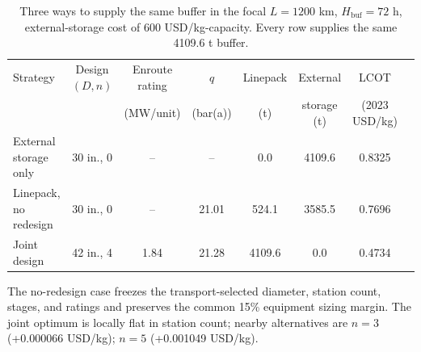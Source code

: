 \begin{table}[!t]
\centering
\caption{Three ways to supply the same buffer in the focal $L=1200$ km, $H_{\mathrm{buf}}=72$ h, external-storage cost of 600 USD/kg-capacity. Every row supplies the same 4109.6 t buffer.}
\label{tab:buffer_design_counterfactuals}
\small
\setlength{\tabcolsep}{4.5pt}
\begin{tabular}{lccccccc}
\toprule
Strategy & Design $(D,n)$ & Enroute rating & $q$ & Linepack & External & LCOT \\
 &  & (MW/unit) & (bar(a)) & (t) & storage (t) & (2023 USD/kg) \\
\midrule
External storage only & 30 in., 0 & -- & -- & 0.0 & 4109.6 & 0.8325 \\
Linepack, no redesign & 30 in., 0 & -- & 21.01 & 524.1 & 3585.5 & 0.7696 \\
Joint design & 42 in., 4 & 1.84 & 21.28 & 4109.6 & 0.0 & 0.4734 \\
\bottomrule
\end{tabular}
\begin{minipage}{0.96\textwidth}\footnotesize The no-redesign case freezes the transport-selected diameter, station count, stages, and ratings and preserves the common 15\% equipment sizing margin. The joint optimum is locally flat in station count; nearby alternatives are $n=3$ (+0.000066 USD/kg); $n=5$ (+0.001049 USD/kg).\end{minipage}
\end{table}
